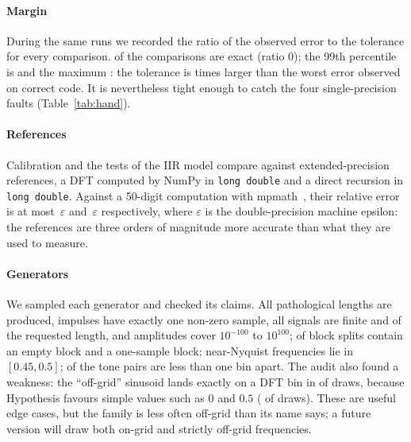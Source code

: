 \documentclass[10pt,conference]{IEEEtran}
\newcommand{\eps}{\varepsilon}
\newcommand{\code}[1]{\texttt{#1}}
\begin{document}
\paragraph*{Margin} During the same runs we recorded the ratio of the observed
error to the tolerance for every comparison. \marginExact{} of the comparisons
are exact (ratio 0); the 99th percentile is \marginPnn{} and the maximum
\marginMax: the tolerance is \marginFactor{} times larger than the worst error
observed on correct code. It is nevertheless tight enough to catch the four
single-precision faults (Table~\ref{tab:hand}).

\paragraph*{References} Calibration and the tests of the IIR model compare
against extended-precision references, a DFT computed by NumPy in
\code{long double} and a direct recursion in \code{long double}. Against
a 50-digit computation with mpmath~\cite{mpmath}, their relative error is at most
$\,\eps$ and $\,\eps$ respectively, where $\eps$ is
the double-precision machine epsilon: the references are three orders of
magnitude more accurate than what they are used to measure.

\paragraph*{Generators} We sampled each generator and checked its claims.
All \genPathoCount{} pathological lengths are produced, impulses have
exactly one non-zero sample, all signals are finite and of the requested
length, and amplitudes cover $10^{-100}$ to $10^{100}$; \genEmptyBlock{} of
block splits contain an empty block and \genOneBlock{} a one-sample block;
near-Nyquist frequencies lie in $[0.45,0.5]$; \genCloseBelowOne{} of the tone
pairs are less than one bin apart. The audit also found a weakness: the
``off-grid'' sinusoid lands exactly on a DFT bin in \genOnGrid{} of draws,
because Hypothesis favours simple values such as 0 and $0.5$ (\genZeroNyq{} of
draws). These are useful edge cases, but the family is less often off-grid than
its name says; a future version will draw both on-grid and strictly off-grid
frequencies.
\end{document}
